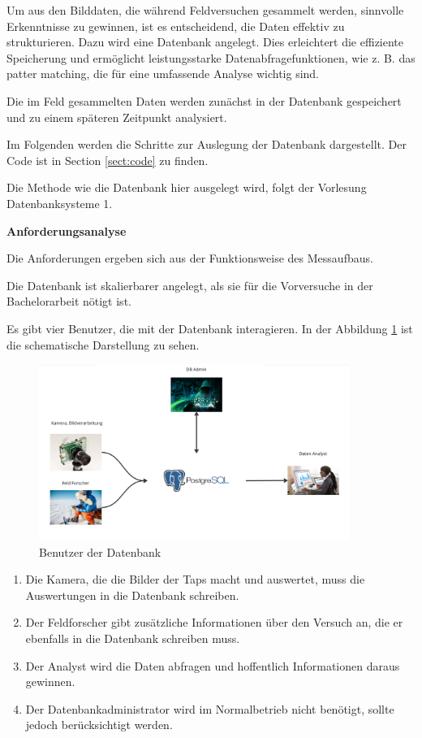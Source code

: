 
Um aus den Bilddaten, die während Feldversuchen gesammelt werden, sinnvolle Erkenntnisse zu gewinnen, ist es entscheidend, die Daten effektiv zu strukturieren. Dazu wird eine Datenbank angelegt. Dies erleichtert die effiziente Speicherung und ermöglicht leistungsstarke Datenabfragefunktionen, wie z. B. das patter matching, die für eine umfassende Analyse wichtig sind.

Die im Feld gesammelten Daten werden zunächst in der Datenbank gespeichert und zu einem späteren Zeitpunkt analysiert.

Im Folgenden werden die Schritte zur Auslegung der Datenbank dargestellt. Der Code ist in Section \ref{sect:code} zu finden.

Die Methode wie die Datenbank hier ausgelegt wird, folgt der Vorlesung Datenbanksysteme 1.

\textbf{Anforderungsanalyse}

Die Anforderungen ergeben sich aus der Funktionsweise des Messaufbaus.

Die Datenbank ist skalierbarer angelegt, als sie für die Vorversuche in der Bachelorarbeit nötigt ist.

Es gibt vier Benutzer, die mit der Datenbank interagieren. In der Abbildung \ref{fig:user-db-entwurf} ist die schematische Darstellung zu sehen.

\begin{figure}
    \centering
    \includegraphics[width=0.9\textwidth]{Bilder/Screenshotfrom2024-04-0115-26-08.png}
    \caption{Benutzer der Datenbank}
    \label{fig:user-db-entwurf}
\end{figure}

\begin{enumerate}
\item Die Kamera, die die Bilder der Taps macht und auswertet, muss die Auswertungen in die Datenbank schreiben.
  \item Der Feldforscher gibt zusätzliche Informationen über den Versuch an, die er ebenfalls in die Datenbank schreiben muss.
    
    \item Der Analyst wird die Daten abfragen und hoffentlich Informationen daraus gewinnen.
    
    \item Der Datenbankadministrator wird im Normalbetrieb nicht benötigt, sollte jedoch berücksichtigt werden.
\end{enumerate}

